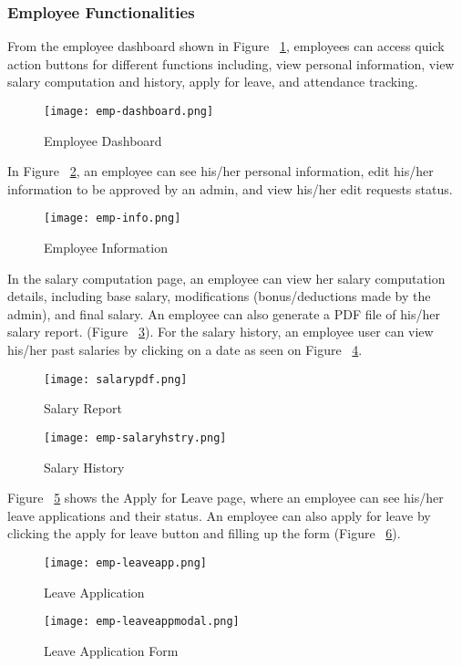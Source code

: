 \documentclass[journal]{./IEEE/IEEEtran}
\begin{document}
\subsubsection{Employee Functionalities} 

From the employee dashboard shown in Figure ~\ref{fig:emp-dash}, employees can access quick action buttons for different functions including, view personal information, view salary computation and history, apply for leave, and attendance tracking.

\begin{figure}[H]
    \centering
    \texttt{[image: emp-dashboard.png]}
    \caption{Employee Dashboard}
    \label{fig:emp-dash}
\end{figure}
In Figure ~\ref{fig:emp-userinfo}, an employee can see his/her personal information, edit his/her information to be approved by an admin, and view his/her edit requests status.
\begin{figure}[H]
    \centering
    \texttt{[image: emp-info.png]}
    \caption{Employee Information }
    \label{fig:emp-userinfo}
\end{figure}
In the salary computation page, an employee can view her salary computation details, including base salary, modifications (bonus/deductions made by the admin), and final salary. An employee can also generate a PDF file of his/her salary report. (Figure ~\ref{fig:salarypdf}). For the salary history, an employee user can view his/her past salaries by clicking on a date as seen on Figure ~\ref{fig:emp-salaryhistory}.
\begin{figure}[H]
    \centering
    \texttt{[image: salarypdf.png]}
    \caption{Salary Report}
    \label{fig:salarypdf}
\end{figure}
\begin{figure}[H]
    \centering
    \texttt{[image: emp-salaryhstry.png]}
    \caption{Salary History}
    \label{fig:emp-salaryhistory}
\end{figure}
Figure ~\ref{fig:emp-leaveapp} shows the Apply for Leave page, where an employee can see his/her leave applications and their status. An employee can also apply for leave by clicking the apply for leave button and filling up the form (Figure ~\ref{fig:emp-leavemodal}).

\begin{figure}[H]
    \centering
    \texttt{[image: emp-leaveapp.png]}
    \caption{Leave Application}
    \label{fig:emp-leaveapp}
\end{figure}
\begin{figure}[H]
    \centering
    \texttt{[image: emp-leaveappmodal.png]}
    \caption{Leave Application Form}
    \label{fig:emp-leavemodal}
\end{figure}
\end{document}
